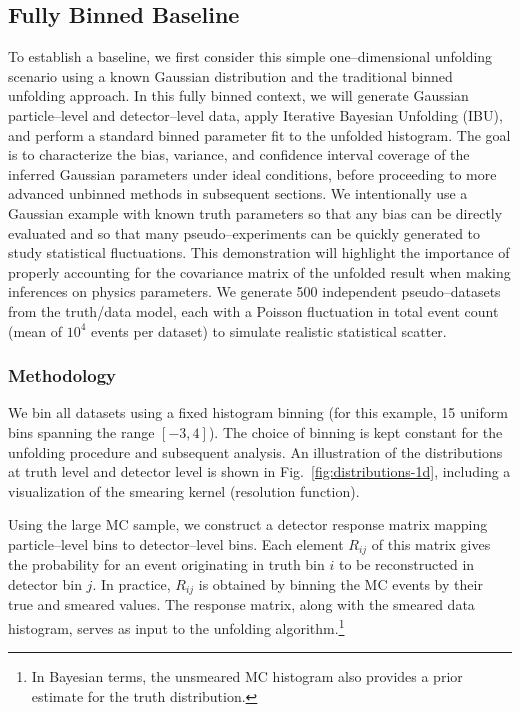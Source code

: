     \subsection{Fully Binned Baseline}
    \label{subsec:fully_binned_demo}
        To establish a baseline, we first consider this simple one--dimensional unfolding scenario using a known Gaussian distribution and the traditional binned unfolding approach.
        In this fully binned context, we will generate Gaussian particle--level and detector--level data, apply Iterative Bayesian Unfolding (IBU), and perform a standard binned parameter fit to the unfolded histogram.
        The goal is to characterize the bias, variance, and confidence interval coverage of the inferred Gaussian parameters under ideal conditions, before proceeding to more advanced unbinned methods in subsequent sections.
        We intentionally use a Gaussian example with known truth parameters so that any bias can be directly evaluated and so that many pseudo--experiments can be quickly generated to study statistical fluctuations.
        This demonstration will highlight the importance of properly accounting for the covariance matrix of the unfolded result when making inferences on physics parameters.
        We generate 500 independent pseudo--datasets from the truth/data model, each with a Poisson fluctuation in total event count (mean of $10^4$ events per dataset) to simulate realistic statistical scatter.
        \subsubsection{Methodology}
        \label{subsec:methodology}
            We bin all datasets using a fixed histogram binning (for this example, 15 uniform bins spanning the range $[-3,4]$).
            The choice of binning is kept constant for the unfolding procedure and subsequent analysis.
            An illustration of the distributions at truth level and detector level is shown in Fig.~\ref{fig:distributions-1d}, including a visualization of the smearing kernel (resolution function).
            
            Using the large MC sample, we construct a detector response matrix mapping particle--level bins to detector--level bins.
            Each element $R_{ij}$ of this matrix gives the probability for an event originating in truth bin $i$ to be reconstructed in detector bin $j$.
            In practice, $R_{ij}$ is obtained by binning the MC events by their true and smeared values.
            The response matrix, along with the smeared data histogram, serves as input to the unfolding algorithm.\footnote{In Bayesian terms, the unsmeared MC histogram also provides a prior estimate for the truth distribution.}
    
